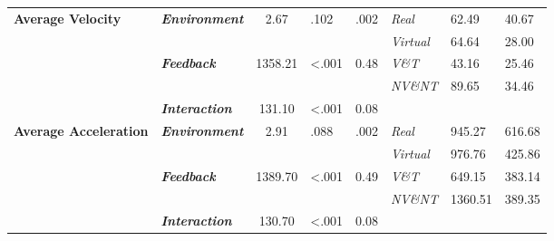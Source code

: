\begin{table}[]
\begin{tabular}{|l|l|c|c|c|l|l|l|}
		\multirow{5}{*}{\textbf{Average Velocity}}           & \multirow{2}{*}{\textit{\textbf{Environment}}} & \multirow{2}{*}{2.67}  & \multicolumn{1}{l|}{\multirow{2}{*}{.102}} & \multicolumn{1}{l|}{\multirow{2}{*}{.002}} & \textit{Real}    & 62.49         & 40.67        \\ \cline{6-8} 
		&                                                & \multicolumn{1}{l|}{}                        & \multicolumn{1}{l|}{}                               & \multicolumn{1}{l|}{}                      & \textit{Virtual} & 64.64         & 28.00        \\ \cline{2-8} 
		& \multirow{2}{*}{\textit{\textbf{Feedback}}}    & \multirow{2}{*}{1358.21} & \multicolumn{1}{l|}{\multirow{2}{*}{\textless.001}} & \multicolumn{1}{l|}{\multirow{2}{*}{0.48}} & \textit{V\&T}    & 43.16         & 25.46        \\ \cline{6-8} 
		&                                                & \multicolumn{1}{l|}{}                        & \multicolumn{1}{l|}{}                               & \multicolumn{1}{l|}{}                      & \textit{NV\&NT}  & 89.65         & 34.46        \\ \cline{2-8} 
		& \textit{\textbf{Interaction}}                  & 131.10                    & \multicolumn{1}{l|}{\textless.001}                           & \multicolumn{1}{l|}{0.08}                 & \multicolumn{3}{l|}{\textit{}}                 \\ \hline
		\multirow{5}{*}{\textbf{Average Acceleration}}           & \multirow{2}{*}{\textit{\textbf{Environment}}} & \multirow{2}{*}{2.91}  & \multicolumn{1}{l|}{\multirow{2}{*}{.088}} & \multicolumn{1}{l|}{\multirow{2}{*}{.002}} & \textit{Real}    & 945.27         & 616.68        \\ \cline{6-8} 
		&                                                & \multicolumn{1}{l|}{}                        & \multicolumn{1}{l|}{}                               & \multicolumn{1}{l|}{}                      & \textit{Virtual} & 976.76         & 425.86        \\ \cline{2-8} 
		& \multirow{2}{*}{\textit{\textbf{Feedback}}}    & \multirow{2}{*}{1389.70} & \multicolumn{1}{l|}{\multirow{2}{*}{\textless.001}} & \multicolumn{1}{l|}{\multirow{2}{*}{0.49}} & \textit{V\&T}    & 649.15         & 383.14        \\ \cline{6-8} 
		&                                                & \multicolumn{1}{l|}{}                        & \multicolumn{1}{l|}{}                               & \multicolumn{1}{l|}{}                      & \textit{NV\&NT}  & 1360.51         & 389.35        \\ \cline{2-8} 
		& \textit{\textbf{Interaction}}                  & 130.70                    & \multicolumn{1}{l|}{\textless.001}                           & \multicolumn{1}{l|}{0.08}                 & \multicolumn{3}{l|}{\textit{}}                 \\ \hline
	\end{tabular}
\end{table}


